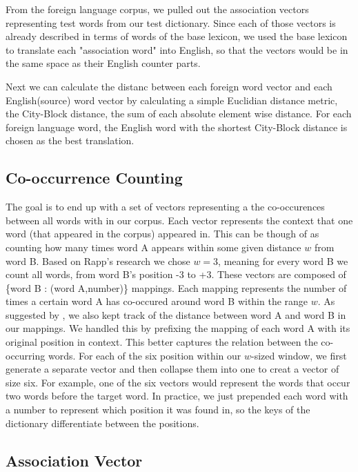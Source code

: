 \documentclass[12pt]{article}
\begin{document}

From the foreign language corpus, we pulled out the association vectors representing test words from our test dictionary. Since each of those vectors is already described in terms of words of the base lexicon, we used the base lexicon to translate each "association word" into English, so that the vectors would be in the same space as their English counter parts.

Next we can calculate the distanc between each foreign word vector and each English(source) word vector by calculating a simple Euclidian distance metric, the City-Block distance, the sum of each absolute element wise distance. For each foreign language word, the English word with the shortest City-Block distance is chosen as the best translation.

\subsection{Co-occurrence Counting}

The goal is to end up with a set of vectors representing a the co-occurences between all words with in our corpus. Each vector
represents the context that one word (that appeared in the corpus) appeared in. This can be though of as counting how many times word A appears within some given distance $w$ from word B. Based on Rapp's research we chose $w=3$, meaning for every word B we count all words, from word B's position -3 to +3. These vectors are composed of \{word B : (word A,number)\} mappings. Each mapping represents the number of times a certain word A has co-occured around word B within the range $w$. As suggested by \cite{rapp1999automatic}, we also kept track of the distance between word A and word B in our mappings. We handled this by prefixing the mapping of each word A with its original position in context. This better captures the relation between the co-occurring words. For each of the six position within our $w$-sized window, we first generate a separate vector and then collapse them into one to creat a vector of size six. For example, one of the six vectors would represent the words that
occur two words before the target word. In practice, we just prepended each word with a number to represent which position it was found in, so the keys of the dictionary differentiate between the positions.

\subsection{Association Vector}
\end{document}
